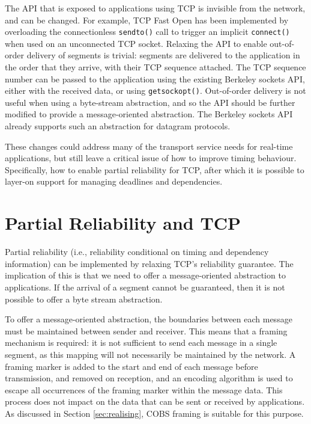 \documentclass{sig-alternate-05-2015}
\begin{document}
The API that is exposed to applications using TCP is invisible from the
network, and can be changed.  For example, TCP Fast Open \cite{RFC7413} 
has been implemented by overloading the connectionless \texttt{sendto()} 
call to trigger an implicit \texttt{connect()} when used on an unconnected
TCP socket.
Relaxing the API to enable out-of-order
delivery of segments is trivial: segments are delivered to the application
in the order that they arrive, with their TCP sequence attached. The TCP
sequence number can be passed to the application using the existing
Berkeley sockets API, either with the received data, or using
\texttt{getsockopt()}. Out-of-order delivery is not useful when using a
byte-stream abstraction, and so the API should be further modified to
provide a message-oriented abstraction. The Berkeley sockets API already
supports such an abstraction for datagram protocols.

These changes could address many of the transport service needs for
real-time applications, but still leave a critical issue of how to improve
timing behaviour. Specifically, how to enable partial reliability for TCP,
after which it is possible to layer-on support for managing deadlines and
dependencies.

\section{Partial Reliability and TCP}
\label{sec:partial}

Partial reliability (i.e., reliability conditional on timing and dependency
information) can be implemented by relaxing TCP's reliability guarantee.
The implication of this is that we need to offer a message-oriented
abstraction to applications. If the arrival of a segment cannot be
guaranteed, then it is not possible to offer a byte stream abstraction.

To offer a message-oriented abstraction, the boundaries between each
message must be maintained between sender and receiver. This means that a
framing mechanism is required: it is not sufficient to send each message in
a single segment, as this mapping will not necessarily be maintained by the
network. A framing marker is added to the start and end of each message
before transmission, and removed on reception, and an encoding algorithm 
is used to escape all occurrences of the framing marker within the message
data. This process does not impact on the data that can be sent or received
by applications. As discussed in Section \ref{sec:realising}, COBS framing
\cite{CB97COBS} is suitable for this purpose.
\end{document}
